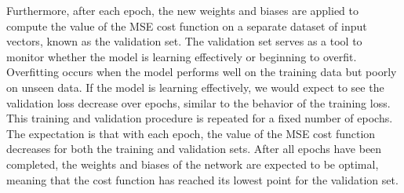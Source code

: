 \newpage
Furthermore, after each epoch, the new weights and biases are applied to compute the value of the MSE cost function on a separate dataset of input vectors, known as the validation set. The validation set serves as a tool to monitor whether the model is learning effectively or beginning to overfit. Overfitting occurs when the model performs well on the training data but poorly on unseen data. If the model is learning effectively, we would expect to see the validation loss decrease over epochs, similar to the behavior of the training loss.
This training and validation procedure is repeated for a fixed number of epochs. The expectation is that with each epoch, the value of the MSE cost function decreases for both the training and validation sets. After all epochs have been completed, the weights and biases of the network are expected to be optimal, meaning that the cost function has reached its lowest point for the validation set.
